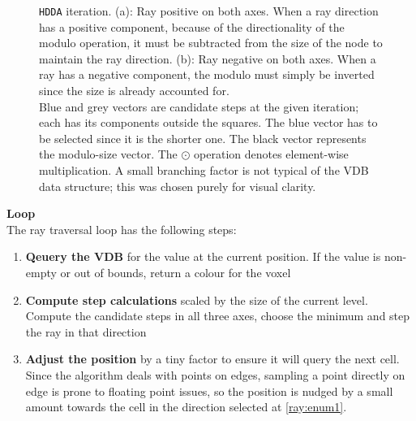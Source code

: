 \begin{figure}[H]
  \centering
  
  \caption[HDDA iteration diagram]{
    \texttt{HDDA} iteration. (a): Ray positive on both axes.
    When a ray direction has a positive component, because of the directionality of the modulo operation, it must be subtracted from the size of the node to maintain the ray direction.
    (b): Ray negative on both axes. When a ray has a negative component, the modulo must simply be inverted since the size is already accounted for. \\
    Blue and grey vectors are candidate steps at the given iteration; each has its components outside the squares.
    The blue vector has to be selected since it is the shorter one.
    The black vector represents the modulo-size vector. The $\odot$ operation denotes element-wise multiplication.
    A small branching factor is not typical of the VDB data structure; this was chosen purely for visual clarity.
  }
  \label{hdda:fig}
\end{figure}

\textbf{Loop} \\
The ray traversal loop has the following steps:
\begin{enumerate}
  \item \textbf{Qeuery the VDB} for the value at the current position. If the value is non-empty or out of bounds, return a colour for the voxel
  \item\label{ray:enum1} \textbf{Compute step calculations} scaled by the size of the current level.
        Compute the candidate steps in all three axes, choose the minimum and step the ray in that direction
  \item \textbf{Adjust the position} by a tiny factor to ensure it will query the next cell.
        Since the algorithm deals with points on edges, sampling a point directly on edge is prone to floating point issues,
        so the position is nudged by a small amount towards the cell in the direction selected at \cref{ray:enum1}.
\end{enumerate}

